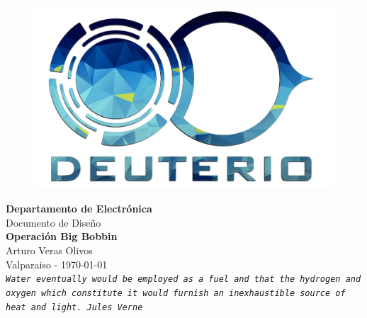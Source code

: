 \setlength{\unitlength}{1 cm} %
\thispagestyle{empty}

\vspace*{-1in}
\begin{figure}[htb]
\begin{center}
\includegraphics[width=12cm]{./figures/deutlogo.png}
\end{center}
\end{figure}

\begin{center}
\textbf{
{\LARGE Departamento de Electr\'onica}}\\[1.25cm]
{\Large Documento de Dise\~no}\\[1.3cm]
{\LARGE \textbf{Operaci\'on Big Bobbin}}\\[2.5cm]
{\large Arturo Veras Olivos}\\[1cm]
Valparaiso - \today
\\[2cm]
{\texttt{\textit{Water eventually would be employed as a fuel and that the hydrogen and oxygen which constitute it would furnish an inexhaustible source of heat and light. Jules Verne}}}
\end{center}
